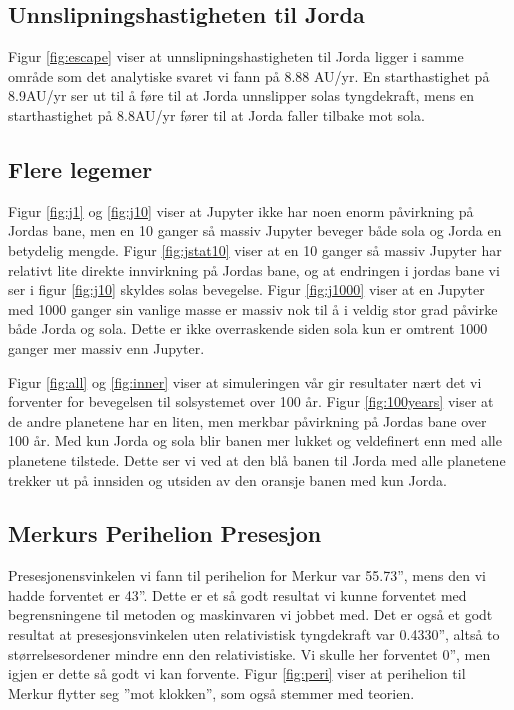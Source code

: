 \documentclass[reprint,english,notitlepage]{revtex4-1}
\begin{document}
\subsection{Unnslipningshastigheten til Jorda}
	Figur \ref{fig:escape} viser at unnslipningshastigheten til Jorda ligger i samme område som det analytiske svaret vi fann på 8.88 AU/yr. En starthastighet på 8.9AU/yr ser ut til å føre til at Jorda unnslipper solas tyngdekraft, mens en starthastighet på 8.8AU/yr fører til at Jorda faller tilbake mot sola.

\subsection{Flere legemer}
	Figur \ref{fig:j1} og \ref{fig:j10} viser at Jupyter ikke har noen enorm påvirkning på Jordas bane, men en 10 ganger så massiv Jupyter beveger både sola og Jorda en betydelig mengde. Figur \ref{fig:jstat10} viser at en 10 ganger så massiv Jupyter har relativt lite direkte innvirkning på Jordas bane, og at endringen i jordas bane vi ser i figur \ref{fig:j10} skyldes solas bevegelse. Figur \ref{fig:j1000} viser at en Jupyter med 1000 ganger sin vanlige masse er massiv nok til å i veldig stor grad påvirke både Jorda og sola. Dette er ikke overraskende siden sola kun er omtrent 1000 ganger mer massiv enn Jupyter.

	Figur \ref{fig:all} og \ref{fig:inner} viser at simuleringen vår gir resultater nært det vi forventer for bevegelsen til solsystemet over 100 år. Figur \ref{fig:100years} viser at de andre planetene har en liten, men merkbar påvirkning på Jordas bane over 100 år. Med kun Jorda og sola blir banen mer lukket og veldefinert enn med alle planetene tilstede. Dette ser vi ved at den blå banen til Jorda med alle planetene trekker ut på innsiden og utsiden av den oransje banen med kun Jorda.
	
\subsection{Merkurs Perihelion Presesjon}
	Presesjonensvinkelen vi fann til perihelion for Merkur var 55.73'', mens den vi hadde forventet er 43''. Dette er et så godt resultat vi kunne forventet med begrensningene til metoden og maskinvaren vi jobbet med. Det er også et godt resultat at presesjonsvinkelen uten relativistisk tyngdekraft var 0.4330'', altså to størrelsesordener mindre enn den relativistiske. Vi skulle her forventet 0'', men igjen er dette så godt vi kan forvente. Figur \ref{fig:peri} viser at perihelion til Merkur flytter seg ''mot klokken'', som også stemmer med teorien.
\end{document}
